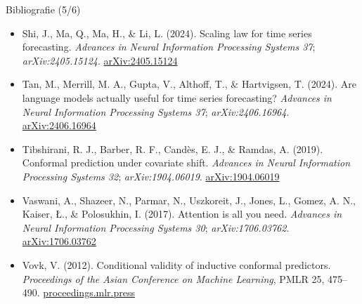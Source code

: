 \begin{frame}{Bibliografie (5/6)}
\begin{itemize}
    \item Shi, J., Ma, Q., Ma, H., \& Li, L. (2024). Scaling law for time series forecasting. \textit{Advances in Neural Information Processing Systems 37}; \textit{arXiv:2405.15124}. \href{https://arxiv.org/abs/2405.15124}{arXiv:2405.15124}
    \item Tan, M., Merrill, M. A., Gupta, V., Althoff, T., \& Hartvigsen, T. (2024). Are language models actually useful for time series forecasting? \textit{Advances in Neural Information Processing Systems 37}; \textit{arXiv:2406.16964}. \href{https://arxiv.org/abs/2406.16964}{arXiv:2406.16964}
    \item Tibshirani, R. J., Barber, R. F., Candès, E. J., \& Ramdas, A. (2019). Conformal prediction under covariate shift. \textit{Advances in Neural Information Processing Systems 32}; \textit{arXiv:1904.06019}. \href{https://arxiv.org/abs/1904.06019}{arXiv:1904.06019}
    \item Vaswani, A., Shazeer, N., Parmar, N., Uszkoreit, J., Jones, L., Gomez, A. N., Kaiser, Ł., \& Polosukhin, I. (2017). Attention is all you need. \textit{Advances in Neural Information Processing Systems 30}; \textit{arXiv:1706.03762}. \href{https://arxiv.org/abs/1706.03762}{arXiv:1706.03762}
    \item Vovk, V. (2012). Conditional validity of inductive conformal predictors. \textit{Proceedings of the Asian Conference on Machine Learning}, PMLR 25, 475--490. \href{https://proceedings.mlr.press/v25/vovk12.html}{proceedings.mlr.press}
\end{itemize}
\end{frame}

